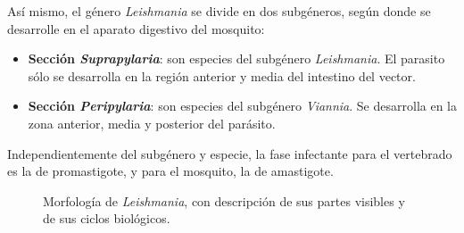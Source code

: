 Así mismo, el género \textit{Leishmania} se divide en dos subgéneros, según donde se desarrolle en el aparato digestivo del mosquito:
\begin{itemize}[itemsep=0pt,parsep=0pt,topsep=0pt,partopsep=0pt] 
	\item \textbf{Sección \textit{Suprapylaria}}: son especies del subgénero \textit{Leishmania}. El parasito sólo se desarrolla en la región anterior y media del intestino del vector.
	\item \textbf{Sección \textit{Peripylaria}}: son especies del subgénero \textit{Viannia}. Se desarrolla en la zona anterior, media y posterior del parásito.
\end{itemize}

Independientemente del subgénero y especie, la fase infectante para el vertebrado es la de promastigote, y para el mosquito, la de amastigote.
\begin{figure}[htpb]  
	\centering
	\caption[Morfología de \textit{Leishmania}]{Morfología de \textit{Leishmania}, con descripción de sus partes visibles y de sus ciclos biológicos. \label{fig:PARASIT:LeishmaniaMorf}}
\end{figure}
